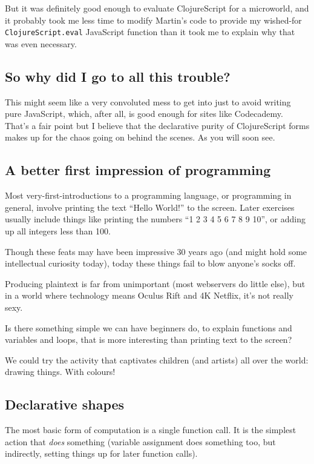 But it was definitely good enough to evaluate ClojureScript for a
microworld, and it probably took me less time to modify Martin's code to
provide my wished-for \texttt{ClojureScript.eval} JavaScript function
than it took me to explain why that was even necessary.

\subsection{So why did I go to all this trouble?}

This might seem like a very convoluted mess to get into just to avoid
writing pure JavaScript, which, after all, is good enough for sites like
Codecademy. That's a fair point but I believe that the declarative
purity of ClojureScript forms makes up for the chaos going on behind the
scenes. As you will soon see.

\subsection{A better first impression of programming}

Most very-first-introductions to a programming language, or programming
in general, involve printing the text ``Hello World!'' to the screen.
Later exercises usually include things like printing the numbers ``1 2 3
4 5 6 7 8 9 10'', or adding up all integers less than 100.

Though these feats may have been impressive 30 years ago (and might hold
some intellectual curiosity today), today these things fail to blow
anyone's socks off.

Producing plaintext is far from unimportant (most webservers do little
else), but in a world where technology means Oculus Rift and 4K Netflix,
it's not really sexy.

Is there something simple we can have beginners do, to explain functions
and variables and loops, that is more interesting than printing text to
the screen?

We could try the activity that captivates children (and artists) all
over the world: drawing things. With colours!

\subsection{Declarative shapes}

The most basic form of computation is a single function call. It is the
simplest action that \emph{does} something (variable assignment does
something too, but indirectly, setting things up for later function
calls).

